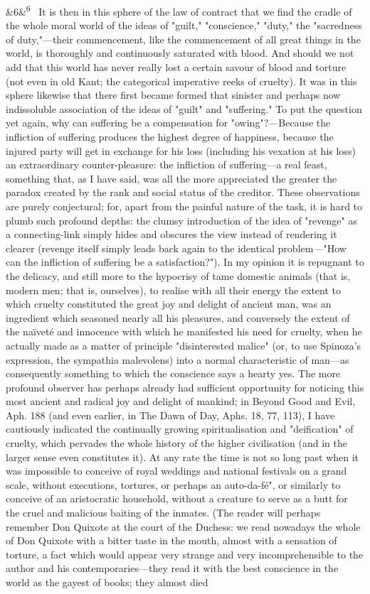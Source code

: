 \documentclass[12pt]{article}
\newcommand{\para}[1][]{\par\noindent\ifx&#1&\else\textsuperscript{\footnotesize #1}~\fi}
\begin{document}
\para[6] It is then in this sphere of the law of contract that we find the cradle of the whole moral world of the ideas of "guilt," "conscience," "duty," the "sacredness of duty,"---their commencement, like the commencement of all great things in the world, is thoroughly and continuously saturated with blood. And should we not add that this world has never really lost a certain savour of blood and torture (not even in old Kant; the categorical imperative reeks of cruelty). It was in this sphere likewise that there first became formed that sinister and perhaps now indissoluble association of the ideas of "guilt" and "suffering." To put the question yet again, why can suffering be a compensation for "owing"?---Because the infliction of suffering produces the highest degree of happiness, because the injured party will get in exchange for his loss (including his vexation at his loss) an extraordinary counter-pleasure: the infliction of suffering---a real feast, something that, as I have said, was all the more appreciated the greater the paradox created by the rank and social status of the creditor. These observations are purely conjectural; for, apart from the painful nature of the task, it is hard to plumb such profound depths: the clumsy introduction of the idea of "revenge" as a connecting-link simply hides and obscures the view instead of rendering it clearer (revenge itself simply leads back again to the identical problem---"How can the infliction of suffering be a satisfaction?"). In my opinion it is repugnant to the delicacy, and still more to the hypocrisy of tame domestic animals (that is, modern men; that is, ourselves), to realise with all their energy the extent to which cruelty constituted the great joy and delight of ancient man, was an ingredient which seasoned nearly all his pleasures, and conversely the extent of the naïveté and innocence with which he manifested his need for cruelty, when he actually made as a matter of principle "disinterested malice" (or, to use Spinoza's expression, the sympathia malevolens) into a normal characteristic of man---as consequently something to which the conscience says a hearty yes. The more profound observer has perhaps already had sufficient opportunity for noticing this most ancient and radical joy and delight of mankind; in Beyond Good and Evil, Aph. 188 (and even earlier, in The Dawn of Day, Aphs. 18, 77, 113), I have cautiously indicated the continually growing spiritualisation and "deification" of cruelty, which pervades the whole history of the higher civilisation (and in the larger sense even constitutes it). At any rate the time is not so long past when it was impossible to conceive of royal weddings and national festivals on a grand scale, without executions, tortures, or perhaps an auto-da-fé", or similarly to conceive of an aristocratic household, without a creature to serve as a butt for the cruel and malicious baiting of the inmates. (The reader will perhaps remember Don Quixote at the court of the Duchess: we read nowadays the whole of Don Quixote with a bitter taste in the mouth, almost with a sensation of torture, a fact which would appear very strange and very incomprehensible to the author and his contemporaries---they read it with the best conscience in the world as the gayest of books; they almost died 
\end{document}

